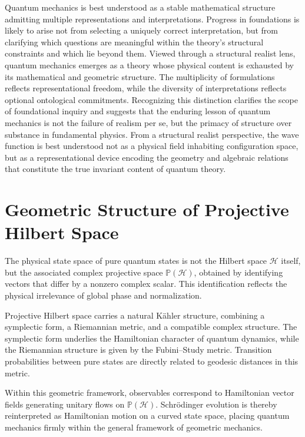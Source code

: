 Quantum mechanics is best understood as a stable mathematical structure 
admitting multiple representations and interpretations. Progress in foundations
is likely to arise not from selecting a uniquely correct interpretation, 
but from clarifying which questions are meaningful within the theory’s structural
constraints and which lie beyond them.
Viewed through a structural realist lens, quantum mechanics emerges as a 
theory whose physical content is exhausted by its mathematical and geometric
structure. The multiplicity of formulations reflects representational freedom, 
while the diversity of interpretations reflects optional ontological commitments. 
Recognizing this distinction clarifies the scope of foundational inquiry and 
suggests that the enduring lesson of quantum mechanics is not the failure of 
realism per se, but the primacy of structure over substance in fundamental physics.
From a structural realist perspective, the wave function is best understood not as 
a physical field inhabiting configuration space, but as a representational device 
encoding the geometry and algebraic relations that constitute the true invariant 
content of quantum theory.

\appendix
\section{Geometric Structure of Projective Hilbert Space}

The physical state space of pure quantum states is not the Hilbert space 
$\mathcal{H}$ itself, but the associated complex projective space 
$\mathbb{P}(\mathcal{H})$, obtained by identifying vectors that differ 
by a nonzero complex scalar. This identification reflects the physical 
irrelevance of global phase and normalization.

Projective Hilbert space carries a natural Kähler structure, combining a 
symplectic form, a Riemannian metric, and a compatible complex structure.
The symplectic form underlies the Hamiltonian character of quantum dynamics, 
while the Riemannian structure is given by the Fubini--Study metric. 
Transition probabilities between pure states are directly related to 
geodesic distances in this metric.

Within this geometric framework, observables correspond to Hamiltonian 
vector fields generating unitary flows on $\mathbb{P}(\mathcal{H})$. 
Schrödinger evolution is thereby reinterpreted as Hamiltonian motion 
on a curved state space, placing quantum mechanics firmly within the 
general framework of geometric mechanics.

